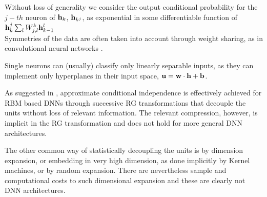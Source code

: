 \documentclass[11pt]{article}
\newcommand{\ignore}[1]{}
\begin{document}
{Without loss of generality we consider the output conditional probability for the $j-th$ neuron of ${\bf h}_{k}$,
${\bf h}_{k^j}$, as exponential in some differentiable function of ${\bf h}_{k}^j \sum_l W^k_{j,l}{\bf h}_{k-1}^l$
\[  
\]
Symmetries of the data are often taken into account through weight sharing, as in convolutional neural networks \cite{lecun1995convolutional,krizhevsky2012imagenet}. 

Single neurons can (usually) classify only linearly separable inputs,
as they can implement only hyperplanes in their input space, ${\bf u}={\bf w}\cdot {\bf h}+{\bf b}$. 

\ignore{
Hyperplanes can optimally classify data when the inputs are conditionally independent. 
To see this, let $p({\bf x}|y)$ denote the (binary) class ($y$) conditional probability of the inputs ${\bf x}$. 
Bayes theorem tells us that
\begin{equation}
p(y|{\bf x})=\frac{1}{1+\exp\left(-\log{\frac{p({\bf x}| y)}{p({\bf x}| y')}}-\log{\frac{p(y)}{p(y')}}\right)}
\end{equation}
which can be written as a sigmoid of a dot-product of the inputs when 
\begin{equation}
\frac{p({\bf x} | y)}{p({\bf x} |y') }=\prod_{j=1}^N \left[\frac{p(x_j|y)}{p(x_j|y')}\right]^{np(x_j)}
\label{eq:Lin-Sep} ~.
\end{equation}
The sigmoidal neuron can calculate precisely the posterior probability with weights 
$w_j=\log{\frac{p(x_j|y)}{p(x_j|y')}}$, and bias $b=\log{\frac{p(y)}{p(y')}}$, when the neuron's inputs are 
proportional to the probability of the respective feature in the input layer, i.e.  $h_j = n p(x_j)$. 
As such conditional independence can not be assumed for general data distributions, 
representational changes through the hidden layers are required, up to linear transformation 
that can decouple the inputs. 
}

As suggested in \cite{MP-SD-2014}, approximate conditional independence is effectively 
achieved for RBM based DNNs through successive RG transformations that decouple the units without loss of
relevant information. The relevant compression, however, is implicit in the RG transformation and does not 
hold for more general DNN architectures.

The other common way of statistically decoupling the units is by dimension expansion, 
or embedding in very high dimension, as done implicitly by Kernel machines, or by random expansion. 
There are nevertheless sample and computational costs to such dimensional expansion 
and these are clearly not DNN architectures.    

}
\end{document}
